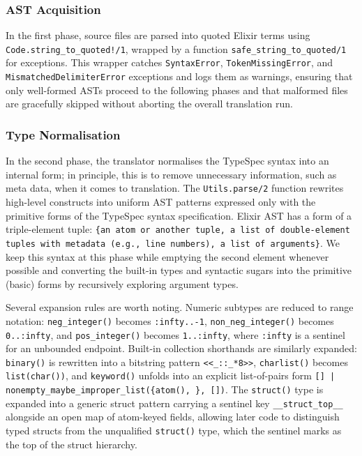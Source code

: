 \subsubsection{AST Acquisition}

In the first phase, source files are parsed into quoted Elixir terms using \texttt{Code.string\_to\_quoted!/1}, wrapped by a function \texttt{safe\_string\_to\_quoted/1} for exceptions.
This wrapper catches \texttt{SyntaxError}, \texttt{TokenMissingError}, and \texttt{MismatchedDelimiterError} exceptions and logs them as warnings, ensuring that only well-formed ASTs proceed to the following phases and that malformed files are gracefully skipped without aborting the overall translation run.

\subsubsection{Type Normalisation}

In the second phase, the translator normalises the TypeSpec syntax into an internal form; in principle, this is to remove unnecessary information, such as meta data, when it comes to translation.
The \texttt{Utils.parse/2} function rewrites high-level constructs into uniform AST patterns expressed only with the primitive forms of the TypeSpec syntax specification.
Elixir AST has a form of a triple-element tuple: \texttt{\{an atom or another tuple, a list of double-element tuples with metadata (e.g., line numbers), a list of arguments\}}.
We keep this syntax at this phase while emptying the second element whenever possible and converting the built-in types and syntactic sugars into the primitive (basic) forms by recursively exploring argument types.

Several expansion rules are worth noting.
Numeric subtypes are reduced to range notation: \texttt{neg\_integer()} becomes \texttt{:infty..-1}, \texttt{non\_neg\_integer()} becomes \texttt{0..:infty}, and \texttt{pos\_integer()} becomes \texttt{1..:infty}, where \texttt{:infty} is a sentinel for an unbounded endpoint.
Built-in collection shorthands are similarly expanded: \texttt{binary()} is rewritten into a bitstring pattern \texttt{<<\_::\_*8>>}, \texttt{charlist()} becomes \texttt{list(char())}, and \texttt{keyword(\TST)} unfolds into an explicit list-of-pairs form \texttt{[] | nonempty\_maybe\_improper\_list(\{atom(), \TST\}, [])}.
The \texttt{struct()} type is expanded into a generic struct pattern carrying a sentinel key \texttt{\_\_struct\_top\_\_} alongside an open map of atom-keyed fields, allowing later code to distinguish typed structs from the unqualified \texttt{struct()} type, which the sentinel marks as the top of the struct hierarchy.

